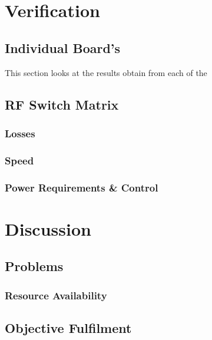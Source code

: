 \documentclass[12pt,openany,a4paper]{book}
\begin{document}
\chapter{Verification}

\section{Individual Board's}
This section looks at the results obtain from each of the 


\section{RF Switch Matrix}

\subsection{Losses}

\subsection{Speed}

\subsection{Power Requirements \& Control}







\chapter{Discussion}
\section{Problems}

\subsection{Resource Availability}


\section{Objective Fulfilment}
\end{document}
